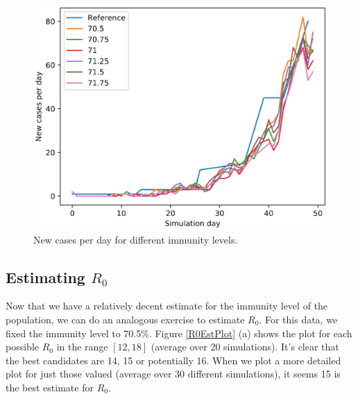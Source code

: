 \documentclass[runningheads]{llncs}
\begin{document}
\begin{figure}[H]
\includegraphics[width=\textwidth]{ImmLvl.eps}
\caption{New cases per day for different immunity levels.} 
\label{immLvlPlot}
\end{figure}


\subsection{Estimating $R_{0}$}
Now that we have a relatively decent estimate for the immunity level of the population, we can do an analogous exercise to estimate $R_0$. For this data, we fixed the immunity level to 70.5\%. Figure \ref{R0EstPlot} (a) shows the plot for each possible $R_0$ in the range $[12, 18]$ (average over 20 simulations). It's clear that the best candidates are 14, 15 or potentially 16. When we plot a more detailed plot for just those valued (average over 30 different simulations), it seems 15 is the best estimate for $R_0$.
\end{document}
